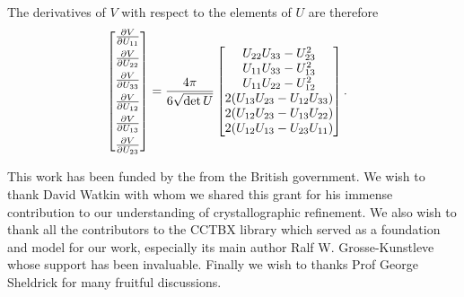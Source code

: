 \documentclass[pdf]{iucr}
\begin{document}
The derivatives of $V$ with respect to the elements of $U$ are therefore
\begin{align}
\begin{bmatrix}
 \frac{\partial V}{\partial U_{11}}\\[0.5em]
 \frac{\partial V}{\partial U_{22}}\\[0.5em]
 \frac{\partial V}{\partial U_{33}}\\[0.5em]
 \frac{\partial V}{\partial U_{12}}\\[0.5em]
 \frac{\partial V}{\partial U_{13}}\\[0.5em]
 \frac{\partial V}{\partial U_{23}}
\end{bmatrix}
 &= \frac{4\pi}{6\sqrt{\det U}}
\begin{bmatrix}
U_{22} U_{33}-U_{23}^2\\
U_{11} U_{33}-U_{13}^2\\
U_{11} U_{22}-U_{12}^2\\
2 (U_{13} U_{23}- U_{12} U_{33})\\
2 (U_{12} U_{23}- U_{13} U_{22})\\
2 (U_{12}U_{13}- U_{23} U_{11} )
\end{bmatrix}.
\end{align}


This work has been funded by the \ourEPSRCgrant from the British government. We wish to thank David Watkin with whom we shared this grant for his immense contribution to our understanding of crystallographic refinement. We also wish to thank all the contributors to the CCTBX library which served as a foundation and model for our work, especially its main author Ralf W. Grosse-Kunstleve whose support has been invaluable. Finally we wish to thanks Prof George Sheldrick for many fruitful discussions.

\end{document}
